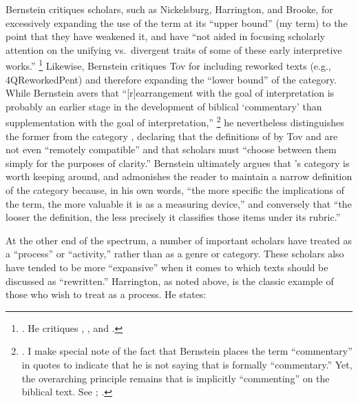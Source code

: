 Bernstein critiques scholars, such as Nickelsburg, Harrington, and Brooke, for excessively expanding the use of the term \rwb at its ``upper bound'' (my term) to the point that they have weakened it, and have ``not aided in focusing scholarly attention on the unifying vs.~divergent traits of some of these early interpretive works.''%
    \footnote{%
        \Cite[179]{bernstein_textus2005}. He critiques 
        \cite{nickelsburg_stone1984}, 
        \cite{harrington_kraft-nickelsburg1986}, and 
        \cite{brooke_schiffman-vanderkam2000}.}
Likewise, Bernstein critiques Tov for including reworked texts (e.g., 4QReworkedPent) and therefore expanding the ``lower bound'' of the category. While Bernstein avers that ``[r]earrangement with the goal of interpretation is probably an earlier stage in the development of biblical `commentary' than supplementation with the goal of interpretation,''%
    \footnote{%
        \Cite[183]{bernstein_textus2005}. I make special note of the fact that Bernstein places the term ``commentary'' in quotes to indicate that he is not saying that \rwb is formally ``commentary.'' Yet, the overarching principle remains that \rwb is implicitly ``commenting'' on the biblical text. See 
        \cite{fraade_bakhos2006}; 
        \cite{fraade_zsengeller2014}.}
he nevertheless distinguishes the former from the category \rwb, declaring that the definitions of \rwb by Tov and \vermes are not even ``remotely compatible'' and that scholars must ``choose between them simply for the purposes of clarity.''%
    \autocite[185]{bernstein_textus2005}
Bernstein ultimately argues that \vermes's category is worth keeping around, and admonishes the reader to maintain a narrow definition of the category because, in his own words, ``the more specific the implications of the term, the more valuable it is as a measuring device,''%
    \autocite[195]{bernstein_textus2005}
and conversely that ``the looser the definition, the less precisely it classifies those items under its rubric.''%
    \autocite[195]{bernstein_textus2005} 

At the other end of the spectrum, a number of important scholars have treated \rwb as a ``process'' or ``activity,'' rather than as a genre or category. These scholars also have tended to be more ``expansive'' when it comes to which texts should be discussed as ``rewritten.'' Harrington, as noted above, is the classic example of those who wish to treat \rwb as a process. He states: 

